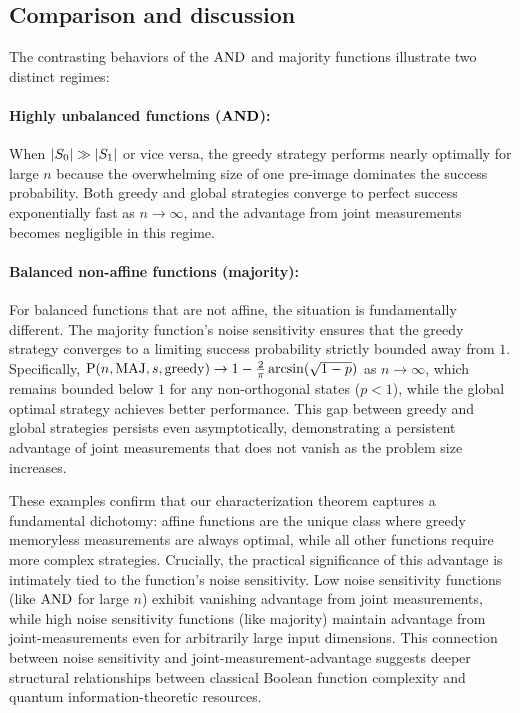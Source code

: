 \subsection{Comparison and discussion}

The contrasting behaviors of the $\mathrm{AND}$ and majority functions illustrate two distinct regimes:

\paragraph{Highly unbalanced functions (\texorpdfstring{$\boldsymbol{\mathrm{AND}}$}{AND}):} When $\abs{S_0} \gg \abs{S_1}$ or vice versa, the greedy strategy performs nearly optimally for large $n$ because the overwhelming size of one pre-image dominates the success probability.
Both greedy and global strategies converge to perfect success exponentially fast as $n \to \infty$, and the advantage from joint measurements becomes negligible in this regime.

\paragraph{Balanced non-affine functions (majority):} For balanced functions that are not affine, the situation is fundamentally different.
The majority function's noise sensitivity ensures that the greedy strategy converges to a limiting success probability strictly bounded away from $1$.
Specifically, $\operatorname{P}(n,\mathrm{MAJ},s,\mathrm{greedy}) \to 1 - \frac{2}{\pi}\arcsin(\sqrt{1-p})$ as $n \to \infty$, which remains bounded below $1$ for any non-orthogonal states ($p < 1$), while the global optimal strategy achieves better performance.
This gap between greedy and global strategies persists even asymptotically, demonstrating a persistent advantage of joint measurements that does not vanish as the problem size increases.

These examples confirm that our characterization theorem captures a fundamental dichotomy: affine functions are the unique class where greedy memoryless measurements are always optimal, while all other functions require more complex strategies.
Crucially, the practical significance of this advantage is intimately tied to the function's noise sensitivity.
Low noise sensitivity functions (like $\mathrm{AND}$ for large $n$) exhibit vanishing advantage from joint measurements, while high noise sensitivity functions (like majority) maintain advantage from joint-measurements even for arbitrarily large input dimensions.
This connection between noise sensitivity and joint-measurement-advantage suggests deeper structural relationships between classical Boolean function complexity and quantum information-theoretic resources.